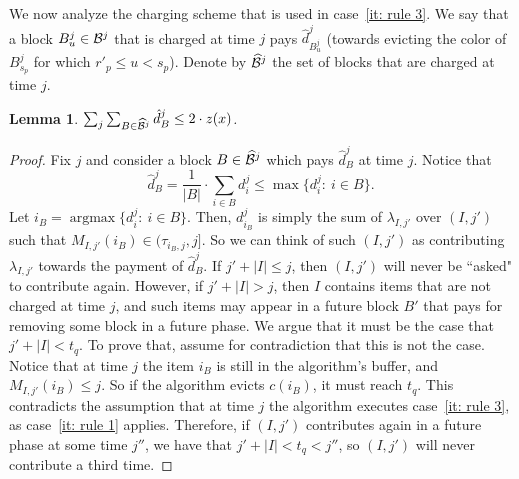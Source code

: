 \documentclass[11pt]{article}
\newtheorem{lemma}[theorem]{Lemma}
\DeclareMathOperator{\argmax}{argmax}
\begin{document}
We now analyze the charging scheme that is used in
case~\ref{it: rule 3}. We say that a block $B^j_u\in {\cal B}^j$
that is charged at time $j$ pays $\hat{d}^j_{B^j_u}$ (towards
evicting the color of $B^j_{s_p}$ for which $r'_p\le u < s_p$).
Denote by $\widehat{\cal B}^j$ the set of blocks that are charged
at time $j$.
\begin{lemma}\label{lm: charge}
$\sum_j \sum_{B\in \widehat{\cal B}^j} \hat{d}^j_B\le 2\cdot z(x)$.
\end{lemma}

\begin{proof}
Fix $j$ and consider a block $B\in\widehat{\cal B}^j$ which pays
$\hat{d}^j_{B}$ at time $j$. Notice that
$$
\hat{d}^j_{B} = \frac{1}{|B|}\cdot\sum_{i\in B} d^j_i\le\max\{d^j_i:\ i\in B\}.
$$
Let $i_B = \argmax\{d^j_i:\ i\in B\}$. Then, $d^j_{i_B}$ is simply the
sum of $\lambda_{I,j'}$ over $(I,j')$ such that
$M_{I,j'}(i_B)\in (\tau_{i_B,j},j]$. So we can think of such $(I,j')$
as contributing $\lambda_{I,j'}$ towards the payment of $\hat{d}^j_{B}$.
If $j' + |I|\le j$, then $(I,j')$ will never be ``asked" to contribute again.
However, if $j' + |I| > j$, then $I$ contains items that are not charged
at time $j$, and such items may appear in a future block $B'$ that
pays for removing some block in a future phase. We argue that
it must be the case that $j' + |I| < t_q$. To prove that, assume for
contradiction that this is not the case. Notice that at time $j$ the item
$i_B$ is still in the algorithm's buffer, and $M_{I,j'}(i_B)\le j$. So
if the algorithm evicts $c(i_B)$, it must reach $t_q$. This contradicts
the assumption that at time $j$ the algorithm executes case~\ref{it: rule 3},
as case~\ref{it: rule 1} applies. Therefore, if $(I,j')$ contributes again
in a future phase at some time $j''$, we have that $j' + |I| < t_q < j''$,
so $(I,j')$ will never contribute a third time.
\end{proof}
\end{document}
